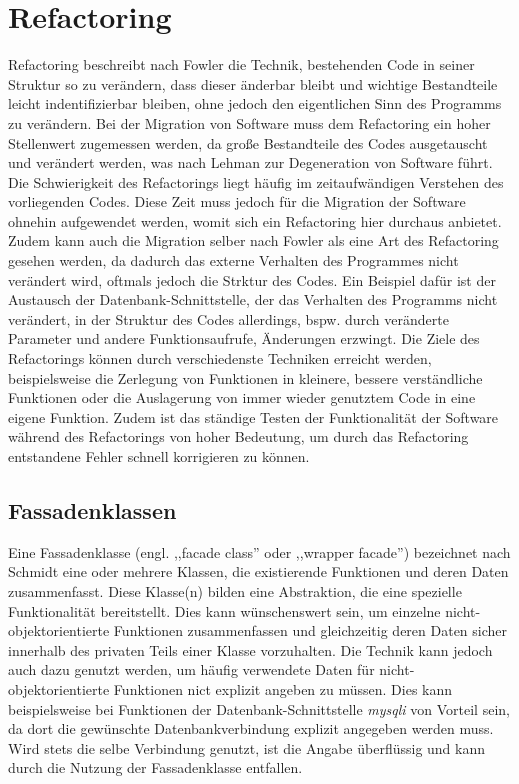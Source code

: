 \section{Refactoring}\label{refactoring} %
    Refactoring beschreibt nach Fowler die Technik, bestehenden Code in seiner Struktur so zu verändern, dass dieser änderbar bleibt und wichtige Bestandteile leicht indentifizierbar 
    bleiben, ohne jedoch den eigentlichen Sinn des Programms zu verändern. \cite{fowler_refactoring_1999} Bei der Migration von Software muss dem Refactoring ein hoher Stellenwert zugemessen werden, 
    da große Bestandteile des Codes ausgetauscht und verändert werden, was nach Lehman \cite[S. 1060-1076]{lehman_programs_1980} zur Degeneration von Software führt.
    Die Schwierigkeit des Refactorings liegt häufig im zeitaufwändigen Verstehen des vorliegenden Codes. Diese Zeit muss jedoch für die Migration der Software ohnehin 
    aufgewendet werden, womit sich ein Refactoring hier durchaus anbietet. Zudem kann auch die Migration selber nach Fowler als eine 
    Art des Refactoring gesehen werden, da dadurch das externe Verhalten des Programmes nicht verändert wird, oftmals jedoch 
    die Strktur des Codes. Ein Beispiel dafür ist der Austausch der Datenbank-Schnittstelle, der das Verhalten des Programms 
    nicht verändert, in der Struktur des Codes allerdings, bspw. durch veränderte Parameter und andere Funktionsaufrufe, 
    Änderungen erzwingt.
    Die Ziele des Refactorings können durch verschiedenste Techniken erreicht werden, beispielsweise die Zerlegung von Funktionen in kleinere, bessere verständliche 
    Funktionen oder die Auslagerung von immer wieder genutztem Code in eine eigene Funktion. Zudem ist das ständige Testen der Funktionalität der Software 
    während des Refactorings von hoher Bedeutung, um durch das Refactoring entstandene Fehler schnell korrigieren zu können.
    \subsection{Fassadenklassen}\label{facade}
    Eine Fassadenklasse (engl. ,,facade class'' oder ,,wrapper facade'') bezeichnet nach Schmidt eine oder mehrere Klassen, die 
    existierende Funktionen und deren Daten zusammenfasst. Diese Klasse(n) bilden eine Abstraktion, die eine spezielle 
    Funktionalität bereitstellt. \cite[S. 54]{schmidt_pattern-oriented_2000} 
    Dies kann wünschenswert sein, um einzelne nicht-objektorientierte Funktionen zusammenfassen und gleichzeitig deren Daten 
    sicher innerhalb des privaten Teils einer Klasse vorzuhalten. Die Technik kann jedoch auch dazu genutzt werden, um häufig 
    verwendete Daten für nicht-objektorientierte Funktionen nict explizit angeben zu müssen. Dies kann beispielsweise 
    bei Funktionen der Datenbank-Schnittstelle \textit{mysqli} von Vorteil sein, da dort die gewünschte Datenbankverbindung 
    explizit angegeben werden muss. Wird stets die selbe Verbindung genutzt, ist die Angabe überflüssig und kann durch die 
    Nutzung der Fassadenklasse entfallen. 
